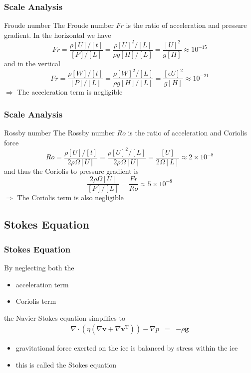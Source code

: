 \documentclass[hide notes,intlimits]{beamer}
\begin{document}
\begin{frame}
  \frametitle{Scale Analysis}
  \begin{block}{Froude number}
    The \alert{Froude number $Fr$} is the ratio of acceleration and pressure gradient. In the horizontal we have
  \begin{equation*}
    Fr = \frac{\rho[U]/[t]}{[P]/[L]} = \frac{\rho[U]^{2}/[L]}{\rho g [H]/[L]} = \frac{[U]^{2}}{g[H]} \approx 10^{-15}
  \end{equation*}
  and in the vertical
  \begin{equation*}
    Fr = \frac{\rho[W]/[t]}{[P]/[L]} = \frac{\rho[W]^{2}/[L]}{\rho g [H]/[L]} = \frac{[\epsilon U]^{2}}{g[H]} \approx 10^{-21}
  \end{equation*}
  $\Rightarrow$ The \alert{acceleration term} is \alert{negligible}
  \end{block}
\end{frame}


\begin{frame}
  \frametitle{Scale Analysis}
  \begin{block}{Rossby number}
    The \alert{Rossby number $Ro$} is the ratio of acceleration and Coriolis force
  \begin{equation*}
    Ro = \frac{\rho[U]/[t]}{2\rho\Omega[U]} = \frac{\rho[U]^{2}/[L]}{2\rho\Omega[U]} = \frac{[U]}{2 \Omega [L]} \approx 2\times10^{-8}
  \end{equation*}
  and thus the Coriolis to pressure gradient is
  \begin{equation*}
   \frac{2\rho\Omega[U]}{[P]/[L]} = \frac{Fr}{Ro}\approx 5 \times 10^{-8}
  \end{equation*}
  $\Rightarrow$ The \alert{Coriolis term} is also \alert{negligible}
  \end{block}
\end{frame}


\subsection{Stokes Equation}


\begin{frame}
  \frametitle{Stokes Equation}
  By neglecting both the
  \begin{itemize}
  \item acceleration term
  \item Coriolis term
  \end{itemize}
  the Navier-Stokes equation simplifies to
  \begin{eqnarray}
     \nabla \cdot \left(\eta\left(\nabla \mathbf{v} + \nabla \mathbf{v}^{\text{T}}\right)\right) - \nabla p & = & - \rho \mathbf{g}
  \end{eqnarray}
  \begin{itemize}
  \item gravitational force exerted on the ice is balanced by stress within the ice
  \item this is called the \alert{Stokes equation}
  \end{itemize}
\end{frame}
\end{document}
